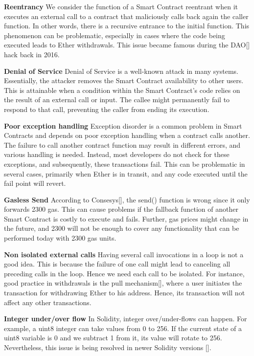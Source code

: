 \documentclass[a4paper,11pt]{article}
\begin{document}
\textbf{Reentrancy}
We consider the function of a Smart Contract reentrant when it executes an
external call to a contract that maliciously calls back again the caller
function. In other words, there is a recursive entrance to the initial function.
This phenomenon can be problematic, especially in cases where the code being
executed leads to Ether withdrawals. This issue became famous during the DAO[]
hack back in 2016.

\textbf{Denial of Service}
Denial of Service is a well-known attack in many systems. Essentially, the
attacker removes the Smart Contract availability to other users. This is
attainable when a condition within the Smart Contract's code relies on the
result of an external call or input. The callee might permanently fail to
respond to that call, preventing the caller from ending its execution.

\textbf{Poor exception handling}
Exception disorder is a common problem in Smart Contracts and depends on poor
exception handling when a contract calls another. The failure to call another
contract function may result in different errors, and various handling is
needed. Instead, most developers do not check for these exceptions, and
subsequently, these transactions fail. This can be problematic in several cases,
primarily when Ether is in transit, and any code executed until the fail point
will revert.

\textbf{Gasless Send}
According to Consesys[], the send() function is wrong since it only forwards
2300 gas. This can cause problems if the fallback function of another Smart
Contract is costly to execute and fails. Further, gas prices might change in the
future, and 2300 will not be enough to cover any functionality that can be
performed today with 2300 gas units.

\textbf{Non isolated external calls}
Having several call invocations in a loop is not a good idea. This is because
the failure of one call might lead to canceling all preceding calls in the loop.
Hence we need each call to be isolated. For instance, good practice in
withdrawals is the pull mechanism[], where a user initiates the transaction for
withdrawing Ether to his address. Hence, its transaction will not affect any
other transactions.

\textbf{Integer under/over flow}
In Solidity, integer over/under-flows can happen. For example, a uint8 integer
can take values from 0 to 256. If the current state of a uint8 variable is 0 and
we subtract 1 from it, its value will rotate to 256. Nevertheless, this issue is
being resolved in newer Solidity versions [].
\end{document}
